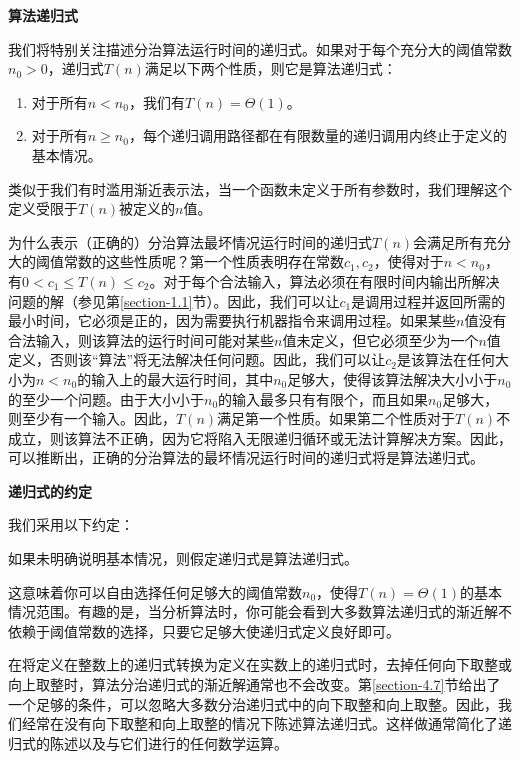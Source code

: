 \documentclass[lang=cn,newtx,10pt,scheme=chinese]{elegantbook}
\begin{document}
\textbf{算法递归式}

我们将特别关注描述分治算法运行时间的递归式。如果对于每个充分大的阈值常数$n_0>0$，递归式$T(n)$满足以下两个性质，则它是算法递归式：

\begin{enumerate}
\item 对于所有$n<n_0$，我们有$T(n)=\Theta(1)$。
\item 对于所有$n \geq n_0$，每个递归调用路径都在有限数量的递归调用内终止于定义的基本情况。
\end{enumerate}

类似于我们有时滥用渐近表示法，当一个函数未定义于所有参数时，我们理解这个定义受限于$T(n)$被定义的$n$值。

为什么表示（正确的）分治算法最坏情况运行时间的递归式$T(n)$会满足所有充分大的阈值常数的这些性质呢？第一个性质表明存在常数$c_1, c_2$，使得对于$n<n_0$，有$0<c_1 \leq T(n) \leq c_2$。对于每个合法输入，算法必须在有限时间内输出所解决问题的解（参见第\ref{section-1.1}节）。因此，我们可以让$c_1$是调用过程并返回所需的最小时间，它必须是正的，因为需要执行机器指令来调用过程。如果某些$n$值没有合法输入，则该算法的运行时间可能对某些$n$值未定义，但它必须至少为一个$n$值定义，否则该“算法”将无法解决任何问题。因此，我们可以让$c_2$是该算法在任何大小为$n<n_0$的输入上的最大运行时间，其中$n_0$足够大，使得该算法解决大小小于$n_0$的至少一个问题。由于大小小于$n_0$的输入最多只有有限个，而且如果$n_0$足够大，则至少有一个输入。因此，$T(n)$满足第一个性质。如果第二个性质对于$T(n)$不成立，则该算法不正确，因为它将陷入无限递归循环或无法计算解决方案。因此，可以推断出，正确的分治算法的最坏情况运行时间的递归式将是算法递归式。

\textbf{递归式的约定}

我们采用以下约定：

\begin{tcolorbox}
如果未明确说明基本情况，则假定递归式是算法递归式。
\end{tcolorbox}

这意味着你可以自由选择任何足够大的阈值常数$n_0$，使得$T(n)=\Theta(1)$的基本情况范围。有趣的是，当分析算法时，你可能会看到大多数算法递归式的渐近解不依赖于阈值常数的选择，只要它足够大使递归式定义良好即可。

在将定义在整数上的递归式转换为定义在实数上的递归式时，去掉任何向下取整或向上取整时，算法分治递归式的渐近解通常也不会改变。第\ref{section-4.7}节给出了一个足够的条件，可以忽略大多数分治递归式中的向下取整和向上取整。因此，我们经常在没有向下取整和向上取整的情况下陈述算法递归式。这样做通常简化了递归式的陈述以及与它们进行的任何数学运算。
\end{document}
